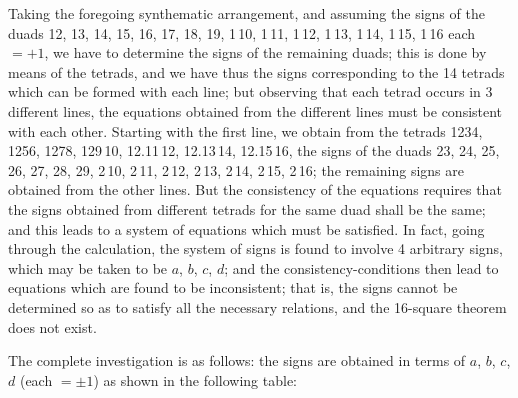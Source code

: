 \documentclass[11pt,a4paper,english]{article}
\theoremstyle{plain}
\begin{document}
\newpage
Taking the foregoing synthematic arrangement, and assuming the signs of the duads 12, 13, 14, 15, 16, 17, 18, 19, 1\,10, 1\,11, 1\,12, 1\,13, 1\,14, 1\,15, 1\,16 each $= +1$, we have to determine the signs of the remaining duads; this is done by means of the tetrads, and we have thus the signs corresponding to the 14 tetrads which can be formed with each line; but observing that each tetrad occurs in 3 different lines, the equations obtained from the different lines must be consistent with each other. Starting with the first line, we obtain from the tetrads 1234, 1256, 1278, 129\,10, 12.11\,12, 12.13\,14, 12.15\,16, the signs of the duads 23, 24, 25, 26, 27, 28, 29, 2\,10, 2\,11, 2\,12, 2\,13, 2\,14, 2\,15, 2\,16; the remaining signs are obtained from the other lines. But the consistency of the equations requires that the signs obtained from different tetrads for the same duad shall be the same; and this leads to a system of equations which must be satisfied. In fact, going through the calculation, the system of signs is found to involve 4 arbitrary signs, which may be taken to be $a$, $b$, $c$, $d$; and the consistency-conditions then lead to equations which are found to be inconsistent; that is, the signs cannot be determined so as to satisfy all the necessary relations, and the 16-square theorem does not exist.

The complete investigation is as follows: the signs are obtained in terms of $a$, $b$, $c$, $d$ (each $= \pm 1$) as shown in the following table:
\end{document}
